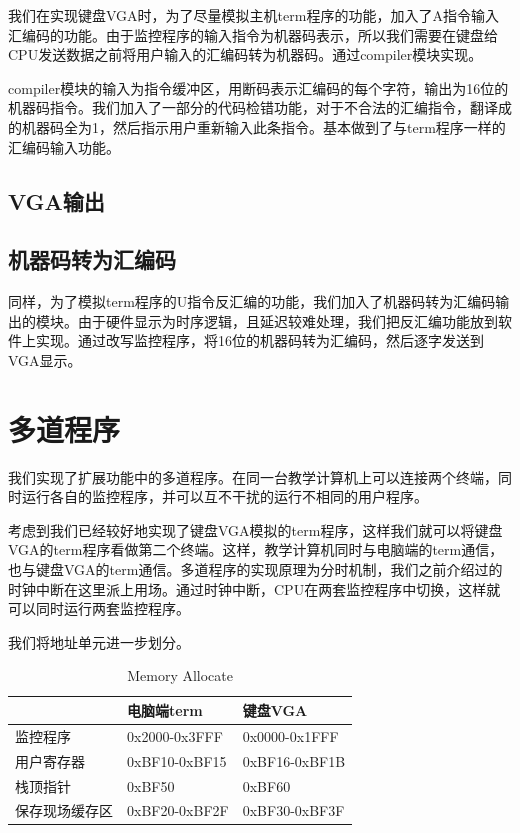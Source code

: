 我们在实现键盘VGA时，为了尽量模拟主机term程序的功能，加入了A指令输入汇编码的功能。由于监控程序的输入指令为机器码表示，所以我们需要在键盘给CPU发送数据之前将用户输入的汇编码转为机器码。通过compiler模块实现。

compiler模块的输入为指令缓冲区，用断码表示汇编码的每个字符，输出为16位的机器码指令。我们加入了一部分的代码检错功能，对于不合法的汇编指令，翻译成的机器码全为1，然后指示用户重新输入此条指令。基本做到了与term程序一样的汇编码输入功能。

\subsection{VGA输出}


\subsection{机器码转为汇编码}

同样，为了模拟term程序的U指令反汇编的功能，我们加入了机器码转为汇编码输出的模块。由于硬件显示为时序逻辑，且延迟较难处理，我们把反汇编功能放到软件上实现。通过改写监控程序，将16位的机器码转为汇编码，然后逐字发送到VGA显示。



\section{多道程序}

我们实现了扩展功能中的多道程序。在同一台教学计算机上可以连接两个终端，同时运行各自的监控程序，并可以互不干扰的运行不相同的用户程序。

考虑到我们已经较好地实现了键盘VGA模拟的term程序，这样我们就可以将键盘VGA的term程序看做第二个终端。这样，教学计算机同时与电脑端的term通信，也与键盘VGA的term通信。多道程序的实现原理为分时机制，我们之前介绍过的时钟中断在这里派上用场。通过时钟中断，CPU在两套监控程序中切换，这样就可以同时运行两套监控程序。

我们将地址单元进一步划分。

\begin{table}[H]
\begin{center}
\renewcommand{\arraystretch}{1.3}
\small
\caption{Memory Allocate}
\label{tab:treatments}
\begin{tabular}{|p{3cm}<{\centering}|p{3.5cm}<{\centering}|p{3.5cm}<{\centering}|}
\hline
 & 电脑端term & 键盘VGA \\
\hline
监控程序 & 0x2000-0x3FFF & 0x0000-0x1FFF \\
\hline
用户寄存器 & 0xBF10-0xBF15 & 0xBF16-0xBF1B \\
\hline
栈顶指针 & 0xBF50 & 0xBF60 \\
\hline
保存现场缓存区 & 0xBF20-0xBF2F & 0xBF30-0xBF3F \\
\hline
\end{tabular}
\end{center}
\end{table}

